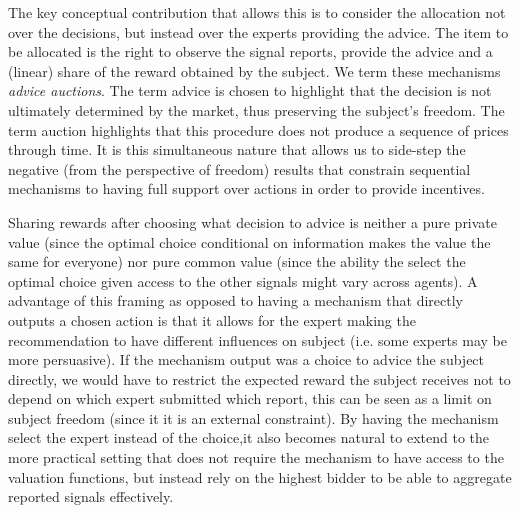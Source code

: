 


The key conceptual contribution that allows this is to consider the allocation not over the decisions, but instead over the experts providing the advice. 
The item to be allocated is the right to observe the signal reports, provide the advice and a (linear) share of the reward obtained by the subject.
We term these mechanisms \emph{advice auctions}.
The term advice is chosen to highlight that the decision is not ultimately determined by the market, thus preserving the subject's freedom.
The term auction highlights that this procedure does not produce a sequence of prices through time.
It is this simultaneous nature that allows us to side-step the negative (from the perspective of freedom) results that constrain sequential mechanisms to having full support over actions in order to provide  incentives.

Sharing rewards after choosing what decision to advice is neither a pure private value (since the optimal choice conditional on information makes the value the same for everyone) nor pure common value (since the ability the select the optimal choice given access to the other signals might vary across agents).
A advantage of this framing as opposed to having a mechanism that directly outputs a chosen action is that it allows for the expert making the recommendation to have different influences on subject (i.e. some experts may be more persuasive).
If the mechanism output was a choice to advice the subject directly, we would have to restrict the expected reward the subject receives not to depend on which expert submitted which report, this can be seen as  a limit on subject freedom (since it it is an external constraint).
By having the mechanism select the expert instead of the choice,it also becomes natural to extend to the more practical setting that does not require the mechanism to have access to the valuation functions, but instead rely on the highest bidder to be able to aggregate reported signals effectively.



